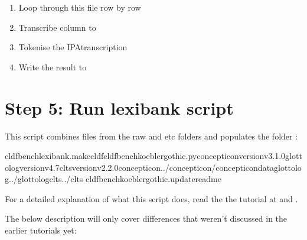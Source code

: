 \documentclass[letterpaper,10pt,english]{sphinxmanual}
\begin{document}
{{{{\begin{fulllineitems}
\begin{enumerate}
\item {} 
\sphinxAtStartPar
Loop through this file row by row

\item {} 
\sphinxAtStartPar
Transcribe column  to 

\item {} 
\sphinxAtStartPar
Tokenise the IPA\sphinxhyphen{}transcription

\item {} 
\sphinxAtStartPar
Write the result to 

\end{enumerate}

\end{fulllineitems}



\section{Step 5: Run lexibank script}
\label{\detokenize{mkcldf:step-5-run-lexibank-script}}
\sphinxAtStartPar
This script combines files from the raw and etc folders and populates the
folder :

\begin{sphinxVerbatim}[commandchars=\\\{\}]
cldfbenchlexibank.makecldfcldfbench\PYGZus{}koeblergothic.py\PYGZhy{}\PYGZhy{}concepticon\PYGZhy{}versionv3.1.0\PYGZhy{}\PYGZhy{}glottolog\PYGZhy{}versionv4.7\PYGZhy{}\PYGZhy{}clts\PYGZhy{}versionv2.2.0\PYGZhy{}\PYGZhy{}concepticon../concepticon/concepticon\PYGZhy{}data\PYGZhy{}\PYGZhy{}glottolog../glottolog\PYGZhy{}\PYGZhy{}clts../clts
cldfbenchkoeblergothic.update\PYGZus{}readme
\end{sphinxVerbatim}

\sphinxAtStartPar
For a detailed explanation of what this script does, read the the tutorial at
 and .

\sphinxAtStartPar
The below description will only cover differences that weren’t discussed
in the earlier tutorials yet:

}}}}
\end{document}
